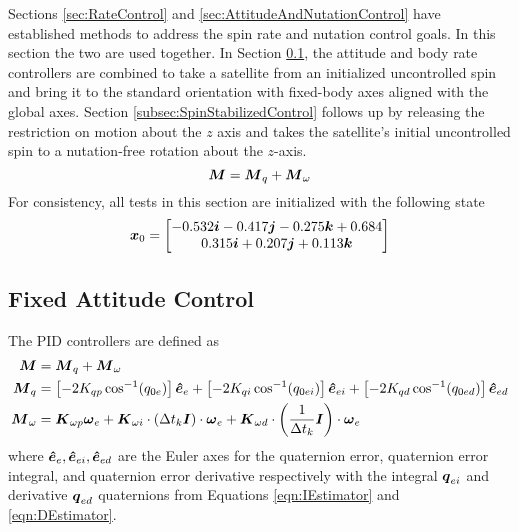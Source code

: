 Sections \ref{sec:RateControl} and \ref{sec:AttitudeAndNutationControl} have established methods to address the spin rate and nutation control goals.  In this section the two are used together.  In Section \ref{subsec:FixedAttitudeControl}, the attitude and body rate controllers are combined to take a satellite from an initialized uncontrolled spin and bring it to the standard orientation with fixed-body axes aligned with the global axes.  Section \ref{subsec:SpinStabilizedControl} follows up by releasing the restriction on motion about the $z$ axis and takes the satellite's initial uncontrolled spin to a nutation-free rotation about the $z$-axis.
\begin{equation}
    \boldsymbol{M} = \boldsymbol{M}_{q} + \boldsymbol{M}_{\omega}
\end{equation}
For consistency, all tests in this section are initialized with the following state
\begin{equation}
  \boldsymbol{x}_0 = \begin{bmatrix} -0.532 \boldsymbol{i} -0.417 \boldsymbol{j} -0.275 \boldsymbol{k} +0.684 \\ 0.315 \boldsymbol{i} +0.207 \boldsymbol{j} +0.113 \boldsymbol{k} \end{bmatrix}
  \label{eqn:attitude_and_body_rate_control_ic}
\end{equation}

\subsection{Fixed Attitude Control}
\label{subsec:FixedAttitudeControl}
The PID controllers are defined as
\begin{equation}
  \begin{aligned}
    \boldsymbol{M} &= \boldsymbol{M}_{q} + \boldsymbol{M}_{\omega} \\
    \boldsymbol{M}_{q} &= \left[-2 K_{qp} \cos^{-1} (q_{0e}) \right] \boldsymbol{\hat{e}}_e + \left[-2 K_{qi} \cos^{-1} (q_{0ei}) \right] \boldsymbol{\hat{e}}_{ei} + \left[-2 K_{qd} \cos^{-1} (q_{0ed}) \right] \boldsymbol{\hat{e}}_{ed} \\
    \boldsymbol{M}_{\omega} &= \boldsymbol{K}_{\omega p} \boldsymbol{\omega}_e + \boldsymbol{K}_{\omega i} \cdot (\Delta t_k \boldsymbol{I})\cdot \boldsymbol{\omega}_e + \boldsymbol{K}_{\omega d} \cdot \left(\frac{1}{\Delta t_k} \boldsymbol{I}\right) \cdot \boldsymbol{\omega}_e
  \end{aligned}
\end{equation}
where $\boldsymbol{\hat{e}}_e, \boldsymbol{\hat{e}}_{ei}, \boldsymbol{\hat{e}}_{ed}$ are the Euler axes for the quaternion error, quaternion error integral, and quaternion error derivative respectively with the integral $\boldsymbol{q}_{ei}$ and derivative $\boldsymbol{q}_{ed}$ quaternions from Equations \ref{eqn:IEstimator} and \ref{eqn:DEstimator}.

